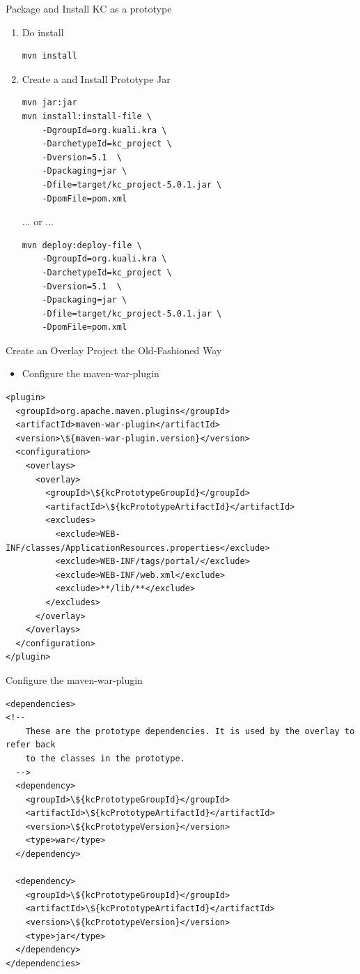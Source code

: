 \documentclass[xcolor=dvipsnames,14pt,professionalfonts]{beamer}
\begin{document}
\begin{frame}[fragile]{Package and Install KC as a prototype}
  \begin{enumerate}
  \item Do install
  \begin{verbatim}
mvn install
  \end{verbatim}
  \item Create a and Install Prototype Jar
  \begin{verbatim}
mvn jar:jar
mvn install:install-file \
    -DgroupId=org.kuali.kra \
    -DarchetypeId=kc_project \ 
    -Dversion=5.1  \
    -Dpackaging=jar \
    -Dfile=target/kc_project-5.0.1.jar \
    -DpomFile=pom.xml
  \end{verbatim}
  ... or ...
  \begin{verbatim}
mvn deploy:deploy-file \
    -DgroupId=org.kuali.kra \
    -DarchetypeId=kc_project \ 
    -Dversion=5.1  \
    -Dpackaging=jar \
    -Dfile=target/kc_project-5.0.1.jar \
    -DpomFile=pom.xml
  \end{verbatim}
\end{enumerate}
\end{frame}

\begin{frame}[fragile]{Create an Overlay Project the Old-Fashioned
    Way}
  \begin{itemize}
  \item Configure the maven-war-plugin
  \end{itemize}
  \begin{verbatim}
<plugin>
  <groupId>org.apache.maven.plugins</groupId>
  <artifactId>maven-war-plugin</artifactId>
  <version>\${maven-war-plugin.version}</version>
  <configuration>
    <overlays>
      <overlay>
        <groupId>\${kcPrototypeGroupId}</groupId>
        <artifactId>\${kcPrototypeArtifactId}</artifactId>
        <excludes>
          <exclude>WEB-INF/classes/ApplicationResources.properties</exclude>
          <exclude>WEB-INF/tags/portal/</exclude>
          <exclude>WEB-INF/web.xml</exclude>
          <exclude>**/lib/**</exclude>
        </excludes>
      </overlay>
    </overlays>
  </configuration>
</plugin>
\end{verbatim}
\end{frame}

\begin{frame}[fragile]{Configure the maven-war-plugin}
  \begin{verbatim}
<dependencies>
<!--
    These are the prototype dependencies. It is used by the overlay to refer back
    to the classes in the prototype.
  -->
  <dependency>
    <groupId>\${kcPrototypeGroupId}</groupId>
    <artifactId>\${kcPrototypeArtifactId}</artifactId>
    <version>\${kcPrototypeVersion}</version>
    <type>war</type>
  </dependency>
  
  <dependency>
    <groupId>\${kcPrototypeGroupId}</groupId>
    <artifactId>\${kcPrototypeArtifactId}</artifactId>
    <version>\${kcPrototypeVersion}</version>
    <type>jar</type>
  </dependency>
</dependencies>
  \end{verbatim}
\end{frame}
\end{document}
